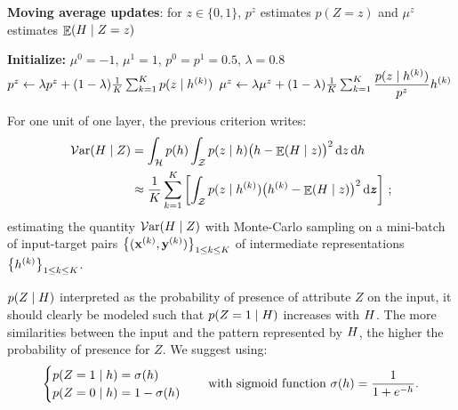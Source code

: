         \begin{algorithm}[tb]
                \caption{\textbf{Moving average updates}:
                for $z \in \{0,1 \}$, $p^z$ estimates $p(Z = z)$ and $\mu^z$ estimates $\mathop{\mathbb{E}}(H\mid Z = z)$}
                \label{shadeA:alg:maupdate}
                \begin{algorithmic}[1]
                \State \textbf{Initialize:} $\mu^0 = -1$, $\mu^1 = 1$, $p^0 = p^1 = 0.5$, $\lambda=0.8$             
                \renewcommand{\algorithmicforall}{\textbf{for each}}
                        \State $p^{z} \leftarrow  \lambda p^{z} +   (1- \lambda)\frac{1}{K}\sum_{k=1}^K p(z\mid h^{(k)})$
                        \State $\mu^{z} \leftarrow \lambda  \mu^{z} +  (1-\lambda)\frac{1}{K}\sum_{k=1}^K\displaystyle \frac{p(z\mid h^{(k)})}{p^z}h^{(k)}$
                    \EndFor
                \EndFor
            \end{algorithmic}
        \end{algorithm}
        
    
        For one unit of one layer, the previous criterion writes:
        \begin{align}
        \label{shadeA:varianceDev}
            \mathcal{V}\mathrm{ar}(H \mid Z) &= \int_{\mathcal{H}} p(h) \int_{\mathcal{Z}}p(z\mid h)\big(h-\mathop{\mathbb{E}}(H\mid z)\big)^2 \,\mathrm{d} z \,\mathrm{d} h \\
            &\approx \frac 1 K \sum_{k=1}^K \left[\int_{\mathcal{Z}}p(z\mid h^{(k)})\big(h^{(k)}-\mathop{\mathbb{E}}(H\mid z)\big)^2 \,\mathrm{d} {\bm{z}} \right]\,;
            \label{shadeA:eq:MC}
        \end{align}
        estimating the quantity $\mathcal{V}\mathrm{ar}(H \mid Z)$  with Monte-Carlo sampling on a mini-batch of input-target pairs $\big\{(\mathbf{x}^{(k)}, \mathbf{y}^{(k)})\big\}_{1 \le k  \le K}$ of intermediate representations $\big\{h^{(k)}\big\}_{1 \le k \le K}$.
        
        $p(Z \mid H)$ interpreted as the probability of presence of attribute $Z$ on the input, it should clearly be modeled such that $p(Z = 1 \mid H)$ increases with $H$. The more similarities between the input and the pattern represented by $H$, the higher the probability of presence for $Z$. We suggest using:
        \begin{equation}
            \begin{cases}
                p(Z=1\mid h) = \sigma(h) \\ p(Z=0 \mid h) = 1- \sigma(h)
            \end{cases}
            \quad \text{with sigmoid function } \sigma(h) = \frac{1}{1 + e^{-h}}.
        \end{equation}
        
